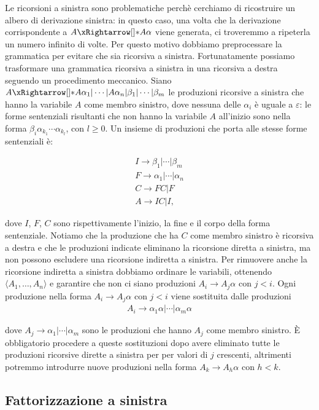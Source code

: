Le ricorsioni a sinistra sono problematiche perchè cerchiamo di ricostruire un albero di derivazione sinistra: in questo
caso, una volta che la derivazione corrispondente a $A\eprod{} A\alpha$ viene generata, ci troveremmo a
ripeterla un numero infinito di volte.
Per questo motivo dobbiamo preprocessare la grammatica \gramm per evitare che sia ricorsiva a sinistra.
Fortunatamente possiamo trasformare una grammatica ricorsiva a sinistra in una ricorsiva a destra seguendo un
procedimento meccanico.
Siano $A\eprod{} A\alpha_{1}| \cdots | A\alpha_{n}|\beta_{1}| \cdots | \beta_{m}$ le  produzioni ricorsive a sinistra
che hanno la variabile $A$ come membro sinistro, dove nessuna delle $\alpha_{i}$ è uguale a $\varepsilon$: le forme
sentenziali risultanti che non hanno la variabile $A$ all'inizio sono nella forma
$\beta_{i}\alpha_{k_{1}}\cdots \alpha_{k_{l}}$, con $l\ge 0$.
Un insieme di produzioni che porta alle stesse forme sentenziali è:

\begin{gather}
I \to \beta_{1}| \cdots | \beta_{m}\\
F \to \alpha_{1}| \cdots | \alpha_{n}\\
C \to FC | F\\
A \to IC | I,
\end{gather}

dove $I$, $F$, $C$ sono rispettivamente l'inizio, la fine e il corpo della forma sentenziale.
Notiamo che la produzione che ha $C$ come membro sinistro è ricorsiva a destra e che le produzioni indicate eliminano la
ricorsione diretta a sinistra, ma non possono escludere una ricorsione indiretta a sinistra.
Per rimuovere anche la ricorsione indiretta a sinistra dobbiamo ordinare le variabili, ottenendo
$\langle A_{1}, \ldots, A_{n}\rangle$ e garantire che non ci siano produzioni $A_{i} \to A_{j}\alpha$ con $j<i$.
Ogni produzione nella forma $A_{i} \to A_{j}\alpha$ con $j<i$ viene sostituita dalle produzioni
\begin{gather}
A_{i} \to \alpha_{1}\alpha| \cdots | \alpha_{m}\alpha
\end{gather}

dove $A_{j} \to \alpha_{1}| \cdots | \alpha_{m}$ sono le produzioni che hanno $A_{j}$ come membro sinistro.
È obbligatorio procedere a queste sostituzioni dopo avere eliminato tutte le produzioni ricorsive dirette a sinistra per
per valori di $j$ crescenti, altrimenti potremmo introdurre nuove produzioni nella forma $A_{k} \to A_{h}\alpha$ con $h<k$.

\subsection{Fattorizzazione a sinistra}\label{sec:left-factoring}


